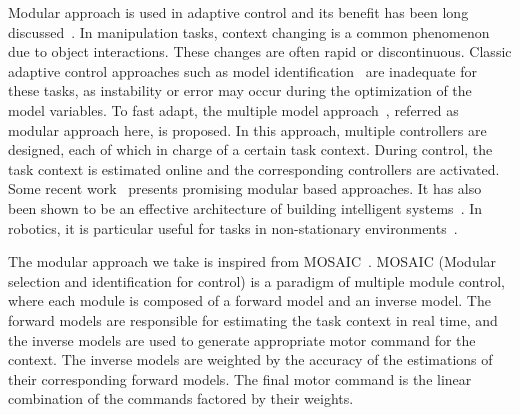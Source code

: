 
Modular approach is used in adaptive control and its benefit has been long discussed~\cite{jacobs1991adaptive,narendra1997adaptive}.
In manipulation tasks, context changing is a common phenomenon due to object interactions. These changes are often rapid or discontinuous. Classic adaptive control approaches such as model identification~\cite{khalil2004modeling} are inadequate for these tasks, as instability or error may occur during the optimization of the model variables. To fast adapt, the multiple model approach~\cite{narendra1995adaptation}, referred as modular approach here, is proposed. In this approach, multiple controllers are designed, each of which in charge of a certain task context. During control, the task context is estimated online and the corresponding controllers are activated.  Some recent work~\cite{fekri2007robust,kuipers2010multiple} presents promising modular based approaches. It has also been shown to be an effective architecture of building intelligent systems~\cite{bryson2004modular,BrysonMcG12}. In robotics, it is particular useful for tasks in non-stationary environments~\cite{sugimoto2012emosaic}.



The modular approach we take is inspired from MOSAIC~\cite{haruno2001mosaic}. MOSAIC (Modular selection and identification for control) is a paradigm of multiple module control, where each module is composed of a forward model and an inverse model. The forward models are responsible for estimating the task context in real time, and the inverse models are used to generate appropriate motor command for the context. The inverse models are weighted by the accuracy of the estimations of their corresponding forward models. The final motor command is the linear combination of the commands factored by their weights.

